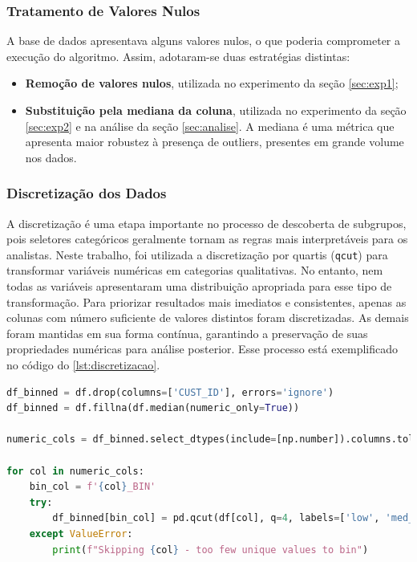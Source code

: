 \documentclass[12pt]{article}
\begin{document}
\subsubsection{Tratamento de Valores Nulos}

\hspace{1.2cm}A base de dados apresentava alguns valores nulos, o que poderia comprometer a execução do algoritmo. Assim, adotaram-se duas estratégias distintas:
\begin{itemize}
    \item \textbf{Remoção de valores nulos}, utilizada no experimento da seção \ref{sec:exp1};
    \item \textbf{Substituição pela mediana da coluna}, utilizada no experimento da seção \ref{sec:exp2} e na análise da seção \ref{sec:analise}. A mediana é uma métrica que apresenta maior robustez à presença de outliers, presentes em grande volume nos dados.
\end{itemize}

\subsubsection{Discretização dos Dados} \label{sec:discretizacao}

\hspace{1.2cm}A discretização é uma etapa importante no processo de descoberta de subgrupos, pois seletores categóricos geralmente tornam as regras mais interpretáveis para os analistas. Neste trabalho, foi utilizada a discretização por quartis (\texttt{qcut}) para transformar variáveis numéricas em categorias qualitativas. No entanto, nem todas as variáveis apresentaram uma distribuição apropriada para esse tipo de transformação. Para priorizar resultados mais imediatos e consistentes, apenas as colunas com número suficiente de valores distintos foram discretizadas. As demais foram mantidas em sua forma contínua, garantindo a preservação de suas propriedades numéricas para análise posterior. Esse processo está exemplificado no código do  \autoref{lst:discretizacao}.

\begin{center}
\begin{lstlisting}[language=Python, caption={Discretização automática com quartis para variáveis numéricas.}, label={lst:discretizacao}]
df_binned = df.drop(columns=['CUST_ID'], errors='ignore')
df_binned = df.fillna(df.median(numeric_only=True))

numeric_cols = df_binned.select_dtypes(include=[np.number]).columns.tolist()

for col in numeric_cols:
    bin_col = f'{col}_BIN'
    try:
        df_binned[bin_col] = pd.qcut(df[col], q=4, labels=['low', 'med_low', 'med_high', 'high'])
    except ValueError:
        print(f"Skipping {col} - too few unique values to bin")
\end{lstlisting}
\end{center}
\end{document}
